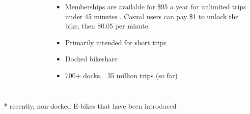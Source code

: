 \documentclass{beamer}
\begin{document}
\begin{frame}
\begin{columns}
\begin{figure}
        \end{figure}
        \begin{itemize}
            \item Memberships are available for \$95 a year for unlimited trips under 45 minutes \cite{cabisite}. Casual users can pay \$1 to unlock the bike, then \$0.05 per minute.
            \item Primarily intended for short trips
            \item Docked bikeshare
            \item 700+ docks, ~35 million trips (so far)
        \end{itemize}
        
    \end{columns}
    \small{* recently, non-docked E-bikes that have been introduced}
\end{frame}
\end{document}

